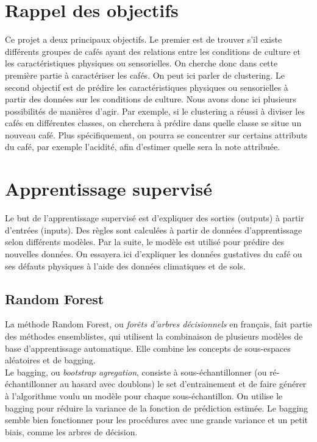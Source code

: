 \section{Rappel des objectifs}\label{obj}
Ce projet a deux principaux objectifs. Le premier est de trouver s'il existe différents groupes de cafés ayant des relations entre les conditions de culture et les caractéristiques physiques ou sensorielles. On cherche donc dans cette première partie à caractériser les cafés. On peut ici parler de clustering.  Le second objectif est de prédire les caractéristiques physiques ou sensorielles à partir des données sur les conditions de culture. Nous avons donc ici plusieurs possibilités de manières d'agir. Par exemple, si le clustering a réussi à diviser les cafés en différentes classes, on cherchera à prédire dans quelle classe se situe un nouveau café. Plus spécifiquement, on pourra se concentrer sur certains attributs du café, par exemple l'acidité, afin d'estimer quelle sera la note attribuée. 


\section{Apprentissage supervisé}
Le but de l'apprentissage supervisé est d'expliquer des sorties (outputs) à partir d'entrées (inputs). Des règles sont calculées à partir de données d'apprentissage selon différents modèles. Par la suite, le modèle est utilisé pour prédire des nouvelles données. On essayera ici d'expliquer les données gustatives du café ou ses défauts physiques à l'aide des données climatiques et de sols. 


\subsection{Random Forest}

La méthode Random Forest, ou \textit{forêts d'arbres décisionnels} en français, fait partie des méthodes ensemblistes\cite{EnsembleMethods}, qui utilisent la combinaison de plusieurs modèles de base d'apprentissage automatique. Elle combine les concepts de sous-espaces aléatoires et de bagging.\\

\noindent Le bagging\label{bagging}, ou \textit{bootstrap agregation}, consiste à sous-échantillonner (ou ré-échantillonner au hasard avec doublons) le set d'entrainement et de faire générer à l’algorithme voulu un modèle pour chaque sous-échantillon. On utilise le bagging pour réduire la variance de la fonction de prédiction estimée. Le bagging semble bien fonctionner pour les procédures avec une grande variance et un petit biais, comme les arbres de décision. \cite{hastie_09_elements-of.statistical-learning}\\


